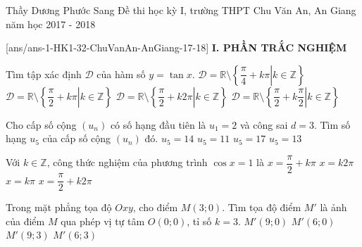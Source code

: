 
	\begin{name}
		{Thầy Dương Phước Sang}
		{Đề thi học kỳ I, trường THPT Chu Văn An, An Giang năm học 2017 - 2018}
	\end{name}
	\setcounter{ex}{0}\setcounter{bt}{0}
	[ans/ans-1-HK1-32-ChuVanAn-AnGiang-17-18]
\noindent\textbf{I. PHẦN TRẮC NGHIỆM}

\begin{ex}%
	Tìm tập xác định $\mathscr{D}$ của hàm số $y=\tan x$.
	\choice
	{$\mathscr{D}=\mathbb{R} \setminus \left\{\dfrac{\pi}{4}+k\pi \left|\right. k \in \mathbb{Z}\right\}$}
	{\True $\mathscr{D}=\mathbb{R} \setminus \left\{\dfrac{\pi}{2}+k\pi\left|\right. k \in \mathbb{Z}\right\}$}
	{$\mathscr{D}=\mathbb{R} \setminus \left\{\dfrac{\pi}{2}+k2\pi\left|\right. k \in \mathbb{Z}\right\}$}
	{$\mathscr{D}=\mathbb{R} \setminus \left\{\dfrac{\pi}{2}+k\dfrac{\pi}{2}\left|\right. k \in \mathbb{Z}\right\}$}
\end{ex}
\begin{ex}%
	Cho cấp số cộng $\left(u_n\right)$ có số hạng đầu tiên là $u_1=2$ và công sai $d=3$. Tìm số hạng $u_5$ của cấp số cộng $\left(u_n\right)$ đó.
	\choice
	{\True $u_5=14$}
	{$u_5=11$}
	{$u_5=17$}
	{$u_5=13$}
\end{ex}
\begin{ex}%
	Với $k \in \mathbb{Z}$, công thức nghiệm của phương trình $\cos x=1$ là
	\choice
	{$x=\dfrac{\pi}{2}+k\pi $}
	{\True $x=k2\pi $}
	{$x=k\pi $}
	{$x=\dfrac{\pi}{2}+k2\pi $}
\end{ex}
\begin{ex}%
	Trong mặt phẳng tọa độ $Oxy$, cho điểm $M(3;0)$. Tìm tọa độ điểm $M'$ là ảnh của điểm $M$ qua phép vị tự tâm $O(0;0)$, tỉ số $k=3$.
	\choice
	{\True $M'(9;0)$}
	{$M'(6;0)$}
	{$M'(9;3)$}
	{$M'(6;3)$}
\end{ex}
